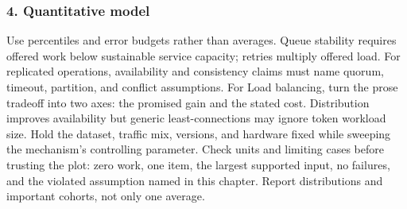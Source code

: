 \subsubsection*{4. Quantitative model}
Use percentiles and error budgets rather than averages. Queue stability requires offered work below sustainable service capacity; retries multiply offered load. For replicated operations, availability and consistency claims must name quorum, timeout, partition, and conflict assumptions.
For Load balancing, turn the prose tradeoff into two axes: the promised gain and the stated cost. Distribution improves availability but generic least-connections may ignore token workload size. Hold the dataset, traffic mix, versions, and hardware fixed while sweeping the mechanism's controlling parameter.
Check units and limiting cases before trusting the plot: zero work, one item, the largest supported input, no failures, and the violated assumption named in this chapter. Report distributions and important cohorts, not only one average.
